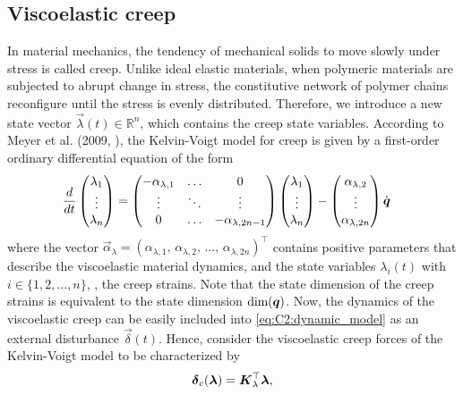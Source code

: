 \subsection{Viscoelastic creep}
\noindent In material mechanics, the tendency of mechanical solids to move slowly under stress is called creep. Unlike ideal elastic materials, when polymeric materials are subjected to abrupt change in stress, the constitutive network of polymer chains reconfigure until the stress is evenly distributed. Therefore, we introduce a new state vector $\vec{\lambda}(t)\in \mathbb{R}^n$, which contains the creep state variables. According to Meyer et al. (2009, \cite{Meyer2009}), the Kelvin-Voigt model for creep is given by a first-order ordinary differential equation of the form
%
\begin{align}
\frac{d}{dt}\begin{pmatrix} {\lambda}_1 \\ \vdots \\ {\lambda}_n \end{pmatrix} & = \begin{pmatrix} -\alpha_{\lambda,1} & \hdots & 0 \\
\vdots & \ddots & \vdots  \\ 0 & \hdots & -\alpha_{\lambda,2n-1} \end{pmatrix} \begin{pmatrix} \lambda_1 \\ \vdots \\ \lambda_n \end{pmatrix} -\begin{pmatrix} \alpha_{\lambda,2} \\ \vdots \\ \alpha_{\lambda,2n} \end{pmatrix} {\dot{\boldsymbol{q}}}
\label{eq:C2:creepmodel}
  \end{align}
%
\noindent where the vector $\vec{\alpha}_\lambda = (\alpha_{\lambda,1},\,\alpha_{\lambda,2},\,...,\,\alpha_{\lambda,2n})^\top$ contains positive parameters that describe the viscoelastic material dynamics, and the state variables $\lambda_i(t)$ with $i \in \{1,2,...,n\}$,  \ie, the creep strains. Note that the state dimension of the creep strains is equivalent to the state dimension $\text{dim}({\boldsymbol{q}})$. Now, the dynamics of the viscoelastic creep can be easily included into
\eqref{eq:C2:dynamic_model} as an external disturbance $\vec{\delta}(t)$. Hence, consider the viscoelastic creep forces of the Kelvin-Voigt model to be characterized by
%
\begin{equation}
\boldsymbol{\delta}_c({\boldsymbol{\lambda}}) = \boldsymbol{K}_{\lambda}^\top \boldsymbol{\lambda},
\label{eq:C2:creepcompliance}
\end{equation}
